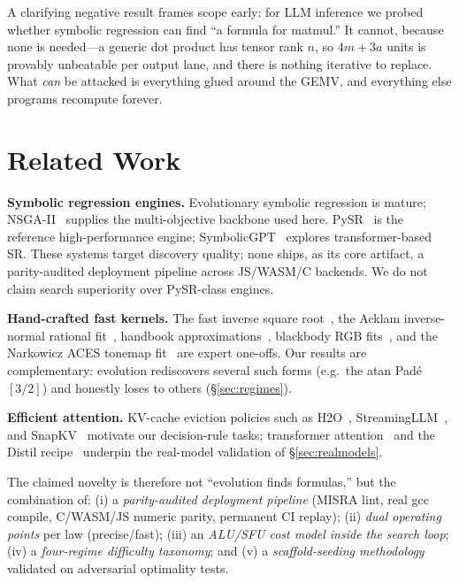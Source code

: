 \documentclass[11pt]{article}
\begin{document}
A clarifying negative result frames scope early: for LLM inference we probed whether symbolic regression can find ``a formula for matmul.'' It cannot, because none is needed---a generic dot product has tensor rank $n$, so $4m+3a$ units is provably unbeatable per output lane, and there is nothing iterative to replace. What \emph{can} be attacked is everything glued around the GEMV, and everything else programs recompute forever.

\section{Related Work}
\textbf{Symbolic regression engines.} Evolutionary symbolic regression is mature; NSGA-II~\cite{deb2002nsga2} supplies the multi-objective backbone used here. PySR~\cite{cranmer2020pysr,cranmer2023pysr} is the reference high-performance engine; SymbolicGPT~\cite{valipour2021symbolicgpt} explores transformer-based SR. These systems target discovery quality; none ships, as its core artifact, a parity-audited deployment pipeline across JS/WASM/C backends. We do not claim search superiority over PySR-class engines.

\textbf{Hand-crafted fast kernels.} The fast inverse square root~\cite{lomont2003invsqrt}, the Acklam inverse-normal rational fit~\cite{acklam2003invnorm}, handbook approximations~\cite{abramowitz1964handbook}, blackbody RGB fits~\cite{helland2012blackbody}, and the Narkowicz ACES tonemap fit~\cite{narkowicz2015aces} are expert one-offs. Our results are complementary: evolution rediscovers several such forms (e.g.\ the atan Pad\'e $[3/2]$) and honestly loses to others (\S\ref{sec:regimes}).

\textbf{Efficient attention.} KV-cache eviction policies such as H2O~\cite{zhang2023h2o}, StreamingLLM~\cite{xiao2024streamingllm}, and SnapKV~\cite{li2024snapkv} motivate our decision-rule tasks; transformer attention~\cite{vaswani2017attention} and the Distil recipe~\cite{sanh2019distilbert} underpin the real-model validation of \S\ref{sec:realmodels}.

The claimed novelty is therefore not ``evolution finds formulas,'' but the combination of: (i) a \emph{parity-audited deployment pipeline} (MISRA lint, real gcc compile, C/WASM/JS numeric parity, permanent CI replay); (ii) \emph{dual operating points} per law (precise/fast); (iii) an \emph{ALU/SFU cost model inside the search loop}; (iv) a \emph{four-regime difficulty taxonomy}; and (v) a \emph{scaffold-seeding methodology} validated on adversarial optimality tests.
\end{document}
